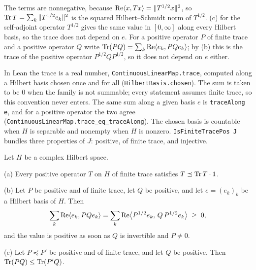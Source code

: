 The terms are nonnegative, because $\operatorname{Re} \langle x, T x \rangle = \|T^{1/2} x\|^2$, so
$\operatorname{Tr} T = \sum_k \|T^{1/2} e_k\|^2$ is the squared Hilbert--Schmidt norm of $T^{1/2}$.
(c) for the self-adjoint operator $T^{1/2}$ gives the same
value in $[0, \infty]$ along every Hilbert basis, so the trace does not depend on $e$. For
a positive operator $P$ of finite trace and a positive operator $Q$ write
$\operatorname{Tr} (P Q) = \sum_k \operatorname{Re} \langle e_k, P Q e_k \rangle$; by (b) this
is the trace of the positive operator $P^{1/2} Q P^{1/2}$, so it does not depend on $e$
either.

In Lean the trace is a real number, \texttt{ContinuousLinearMap.trace}, computed along a
Hilbert basis chosen once and for all (\texttt{HilbertBasis.chosen}). The sum is taken to be
$0$ when the family is not summable; every statement assumes finite trace, so this
convention never enters. The same sum along a given basis $e$ is \texttt{traceAlong e}, and
for a positive operator the two agree (\texttt{ContinuousLinearMap.trace\_eq\_traceAlong}).
The chosen basis is countable when $H$ is separable and nonempty when $H$ is nonzero.
\texttt{IsFiniteTracePos J} bundles three properties of $J$: positive, of finite trace, and
injective.

\begin{lemma}
\label{lem:operator-traces}
\leanok
{}
Let $H$ be a complex Hilbert space.

(a) Every positive operator $T$ on $H$ of finite trace satisfies $T \preceq \operatorname{Tr} T \cdot 1$.

(b) Let $P$ be positive and of finite trace, let $Q$ be positive, and let
$e = (e_k)_k$ be a Hilbert basis of $H$. Then
\[
  \sum_k \operatorname{Re} \langle e_k, P Q e_k \rangle
  = \sum_k \operatorname{Re} \bigl\langle P^{1/2} e_k, \, Q \, P^{1/2} e_k \bigr\rangle
  \; \geq \; 0 ,
\]
and the value is positive as soon as $Q$ is invertible and $P \neq 0$.

(c) Let $P \preceq P'$ be positive and of finite trace, and let $Q$ be positive. Then
$\operatorname{Tr} (P Q) \leq \operatorname{Tr} (P' Q)$.
\end{lemma}

